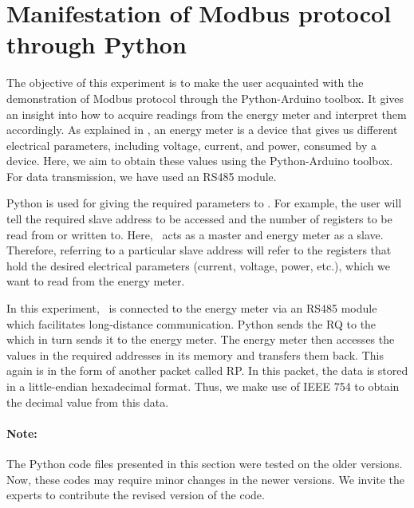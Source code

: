 
\section{Manifestation of Modbus protocol through Python}
The objective of this experiment is to make the user acquainted with
the demonstration of Modbus protocol through the Python-Arduino toolbox. 
It gives an insight into how to acquire readings from the energy meter and interpret them accordingly. As explained in , 
an energy meter is a device that gives us different electrical parameters, including voltage, current, and power, consumed by a device. Here, we aim to obtain these values using the Python-Arduino toolbox. For data transmission, we have used an RS485 module.

Python is used for giving the required parameters to \arduino. For
example, the user will tell the required slave address to be accessed
and the number of registers to be read from or written to. Here,
\arduino\ acts as a master and energy meter as a slave. Therefore,
referring to a particular slave address will refer to the registers
that hold the desired electrical parameters (current, voltage, power, etc.), which we want to read from the energy meter.

In this experiment, \arduino\ is connected to the energy meter via an RS485 module which facilitates long-distance communication. 
Python sends the RQ to the \arduino\, which in turn sends it to the
energy meter. The energy meter then accesses the values in the
required addresses in its memory and transfers them back. This again
is in the form of another packet called RP. In this packet, the data is stored in a little-endian hexadecimal format. Thus, we make use of IEEE 754 to obtain the decimal value from this data. 

\paragraph{Note: } The Python code files presented in this section were tested on the older versions. Now, these codes may require minor changes in
the newer versions. We invite the experts to contribute the revised version of the code.



